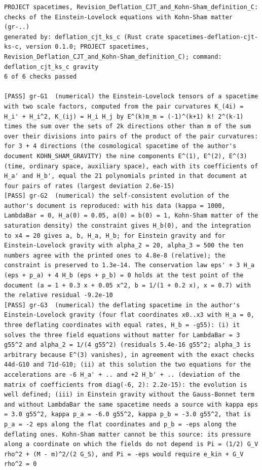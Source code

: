 \documentclass[
  10pt,
]{article}
\begin{document}
\begin{verbatim}
PROJECT spacetimes, Revision_Deflation_CJT_and_Kohn-Sham_definition_C: checks of the Einstein-Lovelock equations with Kohn-Sham matter (gr-..)
generated by: deflation_cjt_ks_c (Rust crate spacetimes-deflation-cjt-ks-c, version 0.1.0; PROJECT spacetimes, Revision_Deflation_CJT_and_Kohn-Sham_definition_C); command: deflation_cjt_ks_c gravity
6 of 6 checks passed

[PASS] gr-G1  (numerical) the Einstein-Lovelock tensors of a spacetime with two scale factors, computed from the pair curvatures K_(4i) = H_i' + H_i^2, K_(ij) = H_i H_j by E^(k)m_m = (-1)^(k+1) k! 2^(k-1) times the sum over the sets of 2k directions other than m of the sum over their divisions into pairs of the product of the pair curvatures: for 3 + 4 directions (the cosmological spacetime of the author's document KOHN_SHAM_GRAVITY) the nine components E^(1), E^(2), E^(3) (time, ordinary space, auxiliary space), each with its coefficients of H_a' and H_b', equal the 21 polynomials printed in that document at four pairs of rates (largest deviation 2.6e-15)
[PASS] gr-G2  (numerical) the self-consistent evolution of the author's document is reproduced: with his data (kappa = 1000, LambdaBar = 0, H_a(0) = 0.05, a(0) = b(0) = 1, Kohn-Sham matter of the saturation density) the constraint gives H_b(0), and the integration to x4 = 20 gives a, b, H_a, H_b; for Einstein gravity and for Einstein-Lovelock gravity with alpha_2 = 20, alpha_3 = 500 the ten numbers agree with the printed ones to 4.8e-8 (relative); the constraint is preserved to 1.3e-14. The conservation law eps' + 3 H_a (eps + p_a) + 4 H_b (eps + p_b) = 0 holds at the test point of the document (a = 1 + 0.3 x + 0.05 x^2, b = 1/(1 + 0.2 x), x = 0.7) with the relative residual -9.2e-10
[PASS] gr-G3  (numerical) the deflating spacetime in the author's Einstein-Lovelock gravity (four flat coordinates x0..x3 with H_a = 0, three deflating coordinates with equal rates, H_b = -g55): (i) it solves the three field equations without matter for LambdaBar = 3 g55^2 and alpha_2 = 1/(4 g55^2) (residuals 5.4e-16 g55^2; alpha_3 is arbitrary because E^(3) vanishes), in agreement with the exact checks 44d-G10 and 71d-G10; (ii) at this solution the two equations for the accelerations are -6 H_a' + .. and +2 H_b' + .. (deviation of the matrix of coefficients from diag(-6, 2): 2.2e-15): the evolution is well defined; (iii) in Einstein gravity without the Gauss-Bonnet term and without LambdaBar the same spacetime needs a source with kappa eps = 3.0 g55^2, kappa p_a = -6.0 g55^2, kappa p_b = -3.0 g55^2, that is p_a = -2 eps along the flat coordinates and p_b = -eps along the deflating ones. Kohn-Sham matter cannot be this source: its pressure along a coordinate on which the fields do not depend is Pi = (1/2) G_V rho^2 + (M - m)^2/(2 G_S), and Pi = -eps would require e_kin + G_V rho^2 = 0

\end{verbatim}
\end{document}
